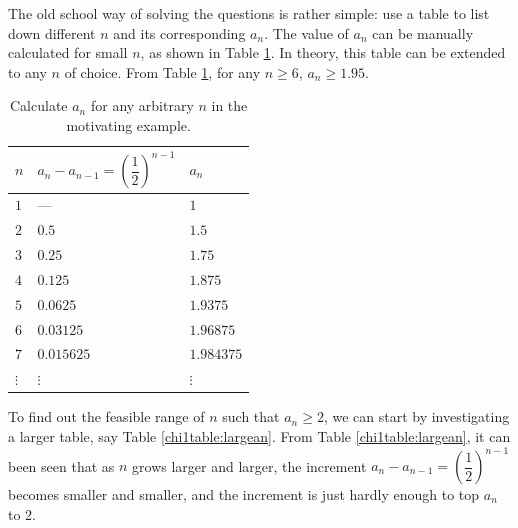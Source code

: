 The old school way of solving the questions is rather simple: use a table to list down different $n$ and its corresponding $a_n$. The value of $a_n$ can be manually calculated for small $n$, as shown in Table \ref{chi1table:smallan}. In theory, this table can be extended to any $n$ of choice. From Table \ref{chi1table:smallan}, for any $n\geq6$, $a_n \geq 1.95$.

\begin{table}[ht]
\caption{Calculate $a_n$ for any arbitrary $n$ in the motivating example.} \label{chi1table:smallan}
\begin{tabular}{lll}
$n$ & $a_n - a_{n-1}=\left(\dfrac{1}{2}\right)^{n-1}$ & $a_n$ \\ \hline
$1$ & --- & $1$ \\
$2$ & $0.5$ & $1.5$ \\
$3$ & $0.25$ & $1.75$ \\
$4$ & $0.125$ & $1.875$ \\
$5$ & $0.0625$ & $1.9375$ \\
$6$ & $0.03125$ & $1.96875$ \\
$7$ & $0.015625$ & $1.984375$ \\
$\vdots$ & $\vdots$ & $\vdots$ \\ \hline
\end{tabular}
\end{table}

To find out the feasible range of $n$ such that $a_n \geq 2$, we can start by investigating a larger table, say Table \ref{chi1table:largean}. From Table \ref{chi1table:largean}, it can been seen that as $n$ grows larger and larger, the increment $a_n - a_{n-1} = \left(\dfrac{1}{2}\right)^{n-1}$ becomes smaller and smaller, and the increment is just hardly enough to top $a_n$ to $2$.

